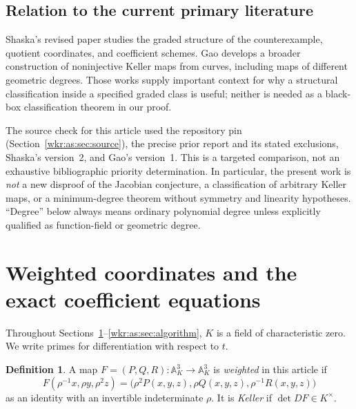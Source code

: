 \documentclass[11pt,a4paper]{article}
\numberwithin{equation}{section}
\theoremstyle{definition}
\newtheorem{definition}[theorem]{Definition}
\theoremstyle{remark}
\newcommand{\A}{\mathbb{A}}
\begin{document}
\subsection{Relation to the current primary literature}

Shaska's revised paper \cite{shaska} studies the graded structure of the
counterexample, quotient coordinates, and coefficient schemes. Gao
\cite{gao} develops a broader construction of noninjective Keller maps
from curves, including maps of different geometric degrees. Those works
supply important context for why a structural classification inside a
specified graded class is useful; neither is needed as a black-box
classification theorem in our proof.

The source check for this article used the repository pin
(Section~\ref{wkr:as:sec:source}), the precise prior report and its stated
exclusions, Shaska's version~2, and Gao's version~1. This is a targeted
comparison, not an exhaustive bibliographic priority determination. In
particular, the present work is \emph{not} a new disproof of the Jacobian
conjecture, a classification of arbitrary Keller maps, or a
minimum-degree theorem without symmetry and linearity hypotheses.
``Degree'' below always means ordinary polynomial degree unless
explicitly qualified as function-field or geometric degree.

\section{Weighted coordinates and the exact coefficient equations}
\label{wkr:as:sec:coordinates}

Throughout Sections~\ref{wkr:as:sec:coordinates}--\ref{wkr:as:sec:algorithm},
$K$ is a field of characteristic zero. We write primes for
differentiation with respect to $t$.

\begin{definition}
A map $F=(P,Q,R):\A^3_K\to\A^3_K$ is \emph{weighted} in this article if
\begin{equation}\label{wkr:as:eq:weights}
F(\rho^{-1}x,\rho y,\rho^2z)
 =\bigl(\rho^2P(x,y,z),\rho Q(x,y,z),\rho^{-1}R(x,y,z)\bigr)
\end{equation}
as an identity with an invertible indeterminate $\rho$. It is
\emph{Keller} if $\det DF\in K^\times$.
\end{definition}
\end{document}
